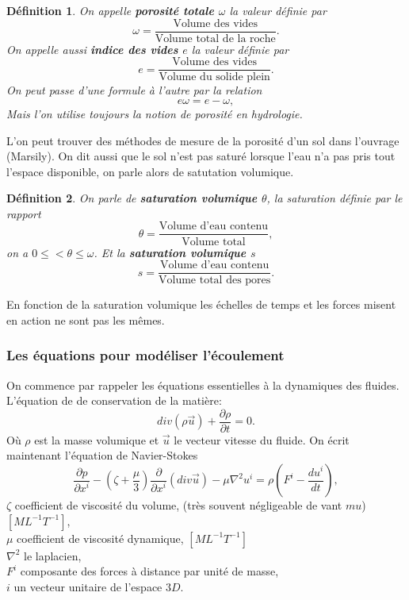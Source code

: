 \documentclass[a4paper,10pt]{article}
\newtheorem{definition}{Définition}
\begin{document}
\label{modelisation}
\begin{definition}
	On appelle \textbf{porosité totale $\omega$} la valeur définie par
	\begin{equation}
		\omega =\frac{\textrm{Volume des vides}}{\textrm{Volume total de la roche}}.
	\end{equation}
	On appelle aussi \textbf{indice des vides $e$} la valeur définie par 
	\begin{equation}
		e=\frac{\textrm{Volume des vides}}{\textrm{Volume du solide plein}}.
	\end{equation}
	On peut passe d'une formule à l'autre par la relation 
	\[e\omega=e-\omega,\]
	Mais l'on utilise toujours la notion de porosité en hydrologie. 
\end{definition}
L'on peut trouver des méthodes de mesure de la porosité d'un sol dans l'ouvrage (Marsily). On dit aussi que le sol n'est pas saturé lorsque l'eau n'a pas pris tout l'espace disponible, on parle alors de satutation volumique.
\begin{definition}
	On parle de \textbf{saturation volumique $\theta$}, la saturation définie par le rapport
	\begin{equation}
		\theta= \frac{\textrm{Volume d'eau contenu}}{\textrm{Volume total}},
	\end{equation}
	on a $0\leq<\theta\leq \omega$. Et la \textbf{saturation volumique $s$}
	\begin{equation}
		s=\frac{\textrm{Volume d'eau contenu}}{\textrm{Volume total des pores}}.
	\end{equation}
\end{definition}

En fonction de la saturation volumique les échelles de temps et les forces misent en action ne sont pas les mêmes.


\subsubsection{Les équations pour modéliser l'écoulement}
\label{darcy}
On commence par rappeler les équations essentielles à la dynamiques des fluides. 
L'équation de de conservation de la matière:
\begin{equation}
	div(\rho \overrightarrow{u})+\frac{\partial \rho}{\partial t}=0.
\end{equation}
Où $\rho$ est la masse volumique et $\overrightarrow{u}$ le vecteur vitesse du fluide. On écrit maintenant l'équation de Navier-Stokes
\begin{equation}
	\frac{\partial p}{\partial x^i}-(\zeta+\frac{\mu}{3})\frac{\partial}{\partial x^i}(div\overrightarrow{u}) - \mu \nabla^2u^i=\rho(F^i -\frac{du^i}{dt}),
\end{equation}
$\zeta$ coefficient de viscosité du volume, (très souvent négligeable de vant $mu$) $[ML^{-1}T^{-1}]$,\\
$\mu$ coefficient de viscosité dynamique, $[ML^{-1}T^{-1}]$\\
$\nabla^2$ le laplacien,\\
$F^i$ composante des forces à distance par unité de masse,\\
$i$ un vecteur unitaire de l'espace $3D$.
\end{document}
